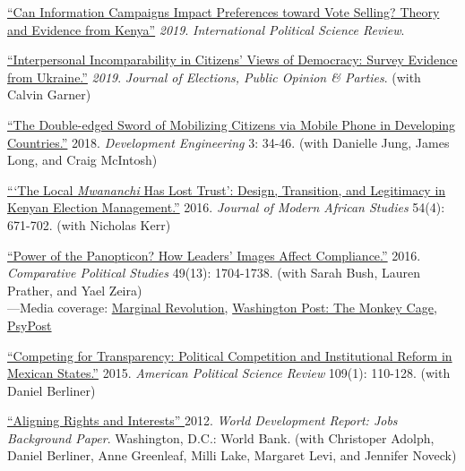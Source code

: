 \documentclass[margin,line]{res}
\begin{document}
{\begin{resume}
\begin{etaremune}
 \item  \href{https://doi.org/10.1177/0192512119836283}{``Can Information Campaigns Impact Preferences toward Vote
   Selling? Theory and Evidence from Kenya''}
   \emph{2019}. \emph{International Political Science Review}.
   
 \item \href{https://doi.org/10.1080/17457289.2018.1554664}{
   ``Interpersonal
     Incomparability in Citizens' Views of Democracy: Survey Evidence
     from Ukraine.''} \emph{2019}. \emph{Journal of Elections,
     Public Opinion \& Parties}. (with Calvin Garner)

 \item  \href{https://doi.org/10.1016/j.deveng.2017.11.001}{``The Double-edged Sword of Mobilizing Citizens via Mobile Phone in
  Developing Countries.''} 2018. \emph{Development
    Engineering}  3: 34-46. (with Danielle Jung, James Long, and Craig McIntosh)

  \item \href{
https://doi.org/10.1017/S0022278X16000604}{```The Local \emph{Mwananchi} Has Lost Trust': Design, Transition,
  and Legitimacy in Kenyan Election Management.''} 2016. \emph{Journal
    of Modern African Studies} 54(4): 671-702. (with Nicholas Kerr)

 \item  \href{https://doi.org/10.1177/0010414016633228}
{``Power of the Panopticon? How Leaders' Images Affect Compliance.''}
  2016.  \emph{Comparative Political Studies} 49(13): 1704-1738. (with
  Sarah Bush, Lauren Prather, and Yael Zeira)\\
  ---Media coverage: \href{https://marginalrevolution.com/marginalrevolution/2016/07/results-free-review.html}{Marginal Revolution},
  \href{https://www.washingtonpost.com/news/monkey-cage/wp/2016/08/25/heres-what-happens-when-scientists-evaluate-research-without-knowing-the-results/?noredirect=on&utm_term=.77408b17a4a9}
  {Washington Post: The Monkey Cage}, \href{https://www.psypost.org/2016/12/scientists-investigate-subliminal-authoritarian-imagery-encourages-citizens-obey-46570}{ PsyPost}

 \item  \href{https://doi.org/10.1177/0010414016633228}{``Competing for Transparency: Political Competition and
  Institutional Reform in Mexican States.''} 2015. \emph{American
  Political Science Review} 109(1): 110-128. (with Daniel Berliner)


\item \href{http://siteresources.worldbank.org/EXTNWDR2013/Resources/8258024-1320950747192/8260293-1320956712276/8261091-1348683883703/WDR2013_bp_Aligning_Rights_and_Incentives.pdf}{``Aligning Rights and
Interests'' } 2012. \emph{World
  Development Report: Jobs Background Paper}. Washington, D.C.: World
Bank. (with Christoper Adolph, Daniel Berliner, Anne
Greenleaf, Milli Lake, Margaret Levi, and Jennifer Noveck)
\end{etaremune}



\end{resume}}
\end{document}
